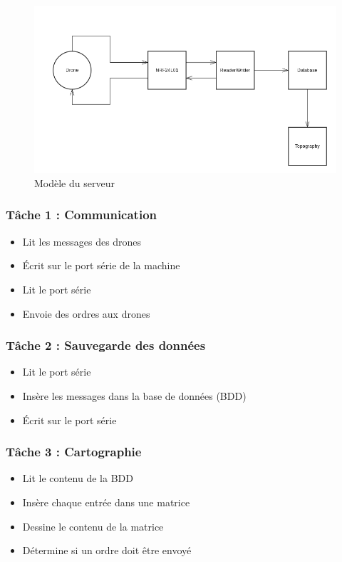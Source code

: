 \documentclass{beamer}
\begin{document}
{	\begin{frame} %
	  \begin{figure}[htbp]
	    \centering
	    \includegraphics[scale=0.3]{img/server_model.png}
	    \caption{Modèle du serveur}
	  \end{figure}  
	\end{frame}

	\begin{frame} %
	  \frametitle{Tâche 1 : Communication}
	
	  \begin{itemize}
	    \item Lit les messages des drones
	    \item Écrit sur le port série de la machine
	    \item Lit le port série
	    \item Envoie des ordres aux drones
	  \end{itemize}
	\end{frame}
	
	\begin{frame} %
	  \frametitle{Tâche 2 : Sauvegarde des données}
	
	  \begin{itemize}
	   \item Lit le port série
	   \item Insère les messages dans la base de données (BDD)
	   \item Écrit sur le port série
	  \end{itemize}
	\end{frame}
	
	\begin{frame} %
	  \frametitle{Tâche 3 : Cartographie}
	
	  \begin{itemize}
	    \item Lit le contenu de la BDD
	    \item Insère chaque entrée dans une matrice
	    \item Dessine le contenu de la matrice
	    \item Détermine si un ordre doit être envoyé
	  \end{itemize}
	\end{frame}

}
\end{document}
